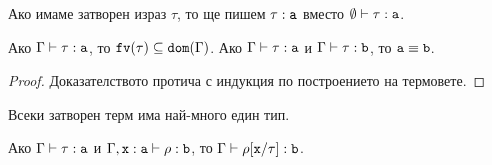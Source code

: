 \begin{prooftree}
\end{prooftree}

Ако имаме затворен израз $\tau$, то ще пишем $\tau : \vv{a}$ вместо $\emptyset \vdash \tau : \vv{a}$.

\begin{proposition}
  Ако $\Gamma \vdash \tau : \vv{a}$, то $\fv(\tau) \subseteq \vv{dom}(\Gamma)$.
  Ако $\Gamma \vdash \tau : \vv{a}$ и $\Gamma \vdash \tau : \vv{b}$, то $\vv{a} \equiv \vv{b}$.
\end{proposition}
\begin{proof}
  Доказателството протича с индукция по построението на термовете.
  
\end{proof}

\begin{corollary}
  Всеки затворен терм има най-много един тип.
\end{corollary}


\begin{proposition}
  Ако $\Gamma \vdash \tau : \vv{a}$ и $\Gamma, \type{x}{a} \vdash \rho : \vv{b}$,
  то $\Gamma \vdash \rho[\vv{x}/\tau] : \vv{b}$.
\end{proposition}



